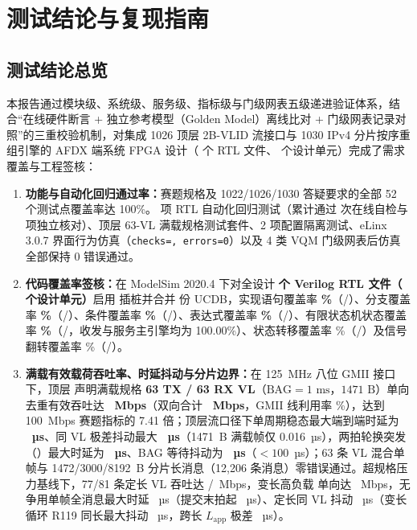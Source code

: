 \chapter{测试结论与复现指南}\label{ch:conclusion}

\section{测试结论总览}

本报告通过模块级、系统级、服务级、指标级与门级网表五级递进验证体系，结合“在线硬件断言 + 独立参考模型（Golden Model）离线比对 + 门级网表记录对照”的三重校验机制，对集成 1026 顶层 2B-VLID 流接口与 1030 IPv4 分片按序重组引擎的 AFDX 端系统 FPGA 设计（\RtlFileCount{} 个 RTL 文件、\DesignUnitCount{} 个设计单元）完成了需求覆盖与工程签核：
\begin{enumerate}
  \item \textbf{功能与自动化回归通过率：}赛题规格及 1022/1026/1030 答疑要求的全部 52 个测试点覆盖率达 100\%。\RegCount{} 项 RTL 自动化回归测试（累计通过 \countsep{\RegChecks} 次在线自检与 \countsep{\RegIndep} 项独立核对）、顶层 63-VL 满载规格测试套件、2 项配置隔离测试、eLinx 3.0.7 界面行为仿真（\texttt{checks=\ElinxChecks{}, errors=0}）以及 4 类 VQM 门级网表后仿真全部保持 0 错误通过。
  \item \textbf{代码覆盖率签核：}在 ModelSim 2020.4 下对全设计 \textbf{\RtlFileCount{} 个 Verilog RTL 文件（\DesignUnitCount{} 个设计单元）}启用  插桩并合并 \CovUcdbCount{} 份 UCDB，实现语句覆盖率 \textbf{\CovStmt\%}（\CovStmtCov/\CovStmtTot）、分支覆盖率 \textbf{\CovBranch\%}（\CovBranchCov/\CovBranchTot）、条件覆盖率 \textbf{\CovCond\%}（\CovCondCov/\CovCondTot）、表达式覆盖率 \textbf{\CovExpr\%}（\CovExprCov/\CovExprTot）、有限状态机状态覆盖率 \textbf{\CovFsmState\%}（\CovFsmStateCov/\CovFsmStateTot，收发与服务主引擎均为 100.00\%）、状态转移覆盖率 \CovFsmTrans\%（\CovFsmTransCov/\CovFsmTransTot）及信号翻转覆盖率 \CovToggle\%（\CovToggleCov/\CovToggleTot）。
  \item \textbf{满载有效载荷吞吐率、时延抖动与分片边界：}在 125~MHz 八位 GMII 接口下，顶层  声明满载规格 \textbf{63 TX / 63 RX VL}（$\text{BAG}=1\text{ ms}$，$1471\text{ B}$）单向去重有效吞吐达 \textbf{\ThruSixtyThree~Mbps}（双向合计 \textbf{\ThruSixtyThreeBi~Mbps}，GMII 线利用率 \LineUtilSixtyThree\%），达到 100~Mbps 赛题指标的 7.41 倍；顶层流口径下单周期稳态最大端到端时延为 \textbf{\LatSixtyThreePMax~µs}、同 VL 极差抖动最大 \textbf{\JitSixtyThreePer~µs}（1471~B 满载帧仅 0.016~µs），两拍轮换突发（）最大时延为 \textbf{\LatSixtyThreeBTwo~µs}、BAG 等待抖动为 \textbf{\JitSixtyThreeBTwo~µs}（$< 100$~µs）；63 条 VL 混合单帧与 1472/3000/8192~B 分片长消息（12,206 条消息）零错误通过。超规格压力基线下，77/81 条定长 VL 吞吐达 \Thru/\ThruEightyOne~Mbps，变长高负载  单向达 \ThruVarHigh~Mbps，无争用单帧全消息最大时延 \Lat~µs（提交末拍起 \LatAppLast~µs）、定长同 VL 抖动 \JitSameVl~µs（变长循环  R119 同长最大抖动 \JitVarCycleTop~µs，跨长 $L_\text{app}$ 极差 \JitVarCycleApp~µs）。

\end{enumerate}
